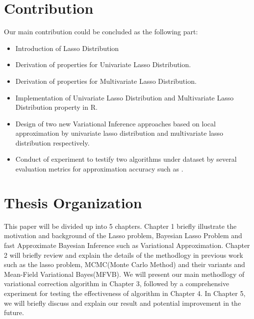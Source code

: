 \section{Contribution}
\label{cont}
Our main contribution could be concluded as the following part:
\begin{itemize}
	\item Introduction of Lasso Distribution
	\item Derivation of properties for Univariate Lasso Distribution.
	\item Derivation of properties for Multivariate Lasso Distribution.
	\item Implementation of Univariate Lasso Distribution and Multivariate Lasso Distribution property in R.
	\item Design of two new Variational Inference approaches based on local approximation by univariate lasso distribution and multivariate lasso distribution respectively.
	\item Conduct of experiment to testify two algorithms under  dataset by several evaluation metrics for approximation accuracy such as .
\end{itemize}



\section{Thesis Organization}
This paper will be divided up into 5 chapters. Chapter 1 briefly illustrate the motivation and background of the Lasso problem, Bayesian Lasso Problem and fast Approximate Bayesian Inference such as Variational Approximation. Chapter 2 will briefly review and explain the details of the methodlogy in previous work such as the lasso problem, MCMC(Monte Carlo Method) and their variants and Mean-Field Variational Bayes(MFVB). We will present our main methodlogy of variational correction algorithm in Chapter 3, followed by a comprehensive experiment for testing the effectiveness of algorithm in Chapter 4. In Chapter 5, we will briefly discuss and explain our result and potential improvement in the future. 



 